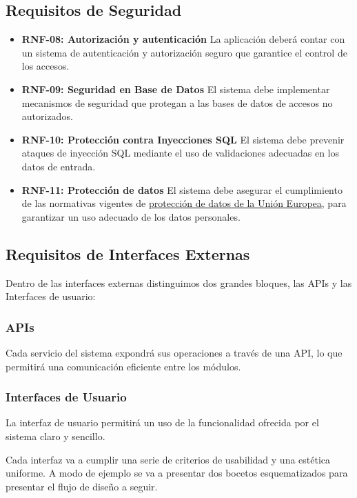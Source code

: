 \subsection{Requisitos de Seguridad}
\begin{itemize}
    \item \textbf{RNF-08: Autorización y autenticación}  
     La aplicación deberá contar con un sistema de autenticación y autorización seguro que garantice el control de los accesos.
    
    \item \textbf{RNF-09: Seguridad en Base de Datos}  
    El sistema debe implementar mecanismos de seguridad que protegan a las bases de datos de accesos no autorizados.
    
    \item \textbf{RNF-10: Protección contra Inyecciones SQL}  
    El sistema debe prevenir ataques de inyección SQL mediante el uso de validaciones adecuadas en los datos de entrada.
    \item \textbf{RNF-11: Protección de datos}
    El sistema debe asegurar el cumplimiento de las normativas vigentes de  \href{https://eur-lex.europa.eu/ES/legal-content/summary/general-data-protection-regulation-gdpr.html}{protección de datos de la Unión Europea}, para garantizar un uso adecuado de los datos personales.
\end{itemize}

\subsection{Requisitos de Interfaces Externas}
Dentro de las interfaces externas distinguimos dos grandes bloques, las APIs y las Interfaces de usuario:

\subsubsection{APIs}
Cada servicio del sistema expondrá sus operaciones a través de una API, lo que permitirá una comunicación eficiente entre los módulos.


\subsubsection{Interfaces de Usuario}

La interfaz de usuario permitirá un uso de la funcionalidad ofrecida por el sistema claro y sencillo.

Cada interfaz va a cumplir una serie de criterios de usabilidad y una estética uniforme. A modo de ejemplo se va a presentar dos bocetos esquematizados para presentar el flujo de diseño a seguir.

